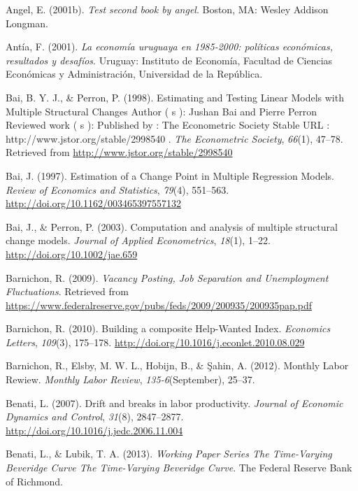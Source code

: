 \documentclass[12pt,oneside]{reedthesis}
\begin{document}
\leavevmode\hypertarget{ref-angel2002a}{}%
Angel, E. (2001b). \emph{Test second book by angel}. Boston, MA: Wesley Addison Longman.

\leavevmode\hypertarget{ref-Antia2001}{}%
Antía, F. (2001). \emph{La economía uruguaya en 1985-2000: políticas económicas, resultados y desafíos}. Uruguay: Instituto de Economía, Facultad de Ciencias Económicas y Administración, Universidad de la República.

\leavevmode\hypertarget{ref-BaiPerron1998}{}%
Bai, B. Y. J., \& Perron, P. (1998). Estimating and Testing Linear Models with Multiple Structural Changes Author ( s ): Jushan Bai and Pierre Perron Reviewed work ( s ): Published by : The Econometric Society Stable URL : http://www.jstor.org/stable/2998540 . \emph{The Econometric Society}, \emph{66}(1), 47--78. Retrieved from \url{http://www.jstor.org/stable/2998540}

\leavevmode\hypertarget{ref-Bai1997}{}%
Bai, J. (1997). Estimation of a Change Point in Multiple Regression Models. \emph{Review of Economics and Statistics}, \emph{79}(4), 551--563. \url{http://doi.org/10.1162/003465397557132}

\leavevmode\hypertarget{ref-BaiPerron2003}{}%
Bai, J., \& Perron, P. (2003). Computation and analysis of multiple structural change models. \emph{Journal of Applied Econometrics}, \emph{18}(1), 1--22. \url{http://doi.org/10.1002/jae.659}

\leavevmode\hypertarget{ref-Barnichon2009}{}%
Barnichon, R. (2009). \emph{Vacancy Posting, Job Separation and Unemployment Fluctuations}. Retrieved from \url{https://www.federalreserve.gov/pubs/feds/2009/200935/200935pap.pdf}

\leavevmode\hypertarget{ref-Barnichon2010}{}%
Barnichon, R. (2010). Building a composite Help-Wanted Index. \emph{Economics Letters}, \emph{109}(3), 175--178. \url{http://doi.org/10.1016/j.econlet.2010.08.029}

\leavevmode\hypertarget{ref-Barnichon2012}{}%
Barnichon, R., Elsby, M. W. L., Hobijn, B., \& Şahin, A. (2012). Monthly Labor Rewiew. \emph{Monthly Labor Review}, \emph{135-6}(September), 25--37.

\leavevmode\hypertarget{ref-Benati2007}{}%
Benati, L. (2007). Drift and breaks in labor productivity. \emph{Journal of Economic Dynamics and Control}, \emph{31}(8), 2847--2877. \url{http://doi.org/10.1016/j.jedc.2006.11.004}

\leavevmode\hypertarget{ref-Benati2013}{}%
Benati, L., \& Lubik, T. A. (2013). \emph{Working Paper Series The Time-Varying Beveridge Curve The Time-Varying Beveridge Curve}. The Federal Reserve Bank of Richmond.
\end{document}
